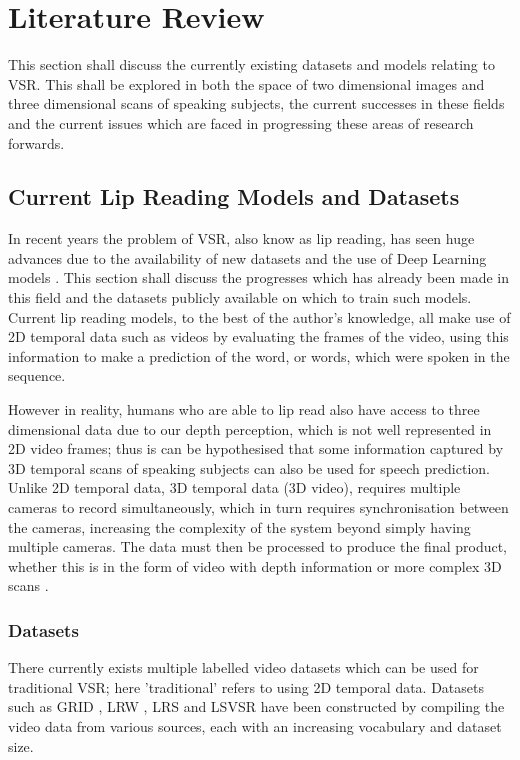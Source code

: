 \chapter{Literature Review}


This section shall discuss the currently existing datasets and models relating to VSR.
This shall be explored in both the space of two dimensional images and three dimensional scans of speaking subjects, the current successes in these fields and the current issues which are faced in progressing these areas of research forwards.

\section{Current Lip Reading Models and Datasets}

In recent years the problem of VSR, also know as lip reading, has seen huge advances due to the availability of new datasets and the use of Deep Learning models \cite{Chung2016, Chung2017, Shillingford2018}.
This section shall discuss the progresses which has already been made in this field and the datasets publicly available on which to train such models.
Current lip reading models, to the best of the author's knowledge, all make use of 2D temporal data such as videos by evaluating the frames of the video, using this information to make a prediction of the word, or words, which were spoken in the sequence.

However in reality, humans who are able to lip read also have access to three dimensional data due to our depth perception, which is not well represented in 2D video frames; thus is can be hypothesised that some information captured by 3D temporal scans of speaking subjects can also be used for speech prediction.
Unlike 2D temporal data, 3D temporal data (3D video), requires multiple cameras to record simultaneously, which in turn requires synchronisation between the cameras, increasing the complexity of the system beyond simply having multiple cameras.
The data must then be processed to produce the final product, whether this is in the form of video with depth information or more complex 3D scans \cite{Li2017}.

\subsection{Datasets}
There currently exists multiple labelled video datasets which can be used for traditional VSR; here 'traditional' refers to using 2D temporal data.
Datasets such as GRID \cite{Cooke2006}, LRW \cite{Chung2016}, LRS \cite{Chung2017} and LSVSR \cite{Shillingford2018} have been constructed by compiling the video data from various sources, each with an increasing vocabulary and dataset size.

